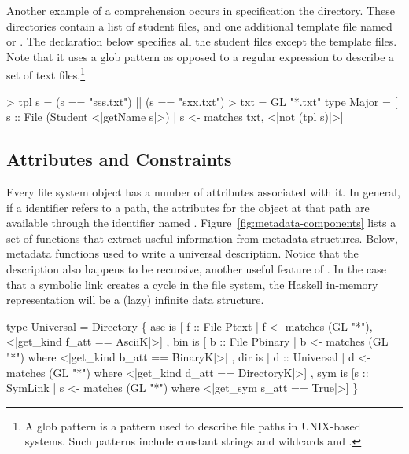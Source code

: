 \documentclass[nocopyrightspace,natbib]{sigplanconf}
\begin{document}
Another example of a comprehension occurs in specification the  
directory.  These directories contain a list of student files, and one additional
template file named  or .  The declaration below
specifies all the student files except the template files.  Note that it uses
a glob pattern as opposed to a regular expression
to describe a set of text files.\footnote{A glob pattern
is a pattern used to describe file paths in UNIX-based systems.  Such patterns include
constant strings and wildcards \cd{*} and .} 
\begin{code}
> tpl s = (s == "sss.txt") || (s == "sxx.txt")
> txt = GL "*.txt"
\mbox{}
type Major =   
  [ s :: File (Student <|getName s|>) 
  | s <- matches txt, <|not (tpl s)|>]
\end{code}

\subsection{Attributes and Constraints}
\label{sec:constraints}

Every file system object has a number of attributes associated with it.  In general,
if a \forest{} identifier  refers to a path, the attributes for the object at that
path are available through the identifier named . Figure~\ref{fig:metadata-components}
lists a set of functions that extract useful information from metadata structures.
Below, metadata functions used to write a universal description.
Notice that the description also happens to be recursive, another useful feature of
\forest{}.  In the case that a symbolic link creates a cycle in the file system, the Haskell
in-memory representation will be a (lazy) infinite data structure. 
\begin{code}
type Universal = Directory 
  \{ asc is [ f :: File Ptext   
           | f <- matches (GL "*"), 
            <|get_kind f_att == AsciiK|>]
  , bin is [ b :: File Pbinary
           | b <- matches (GL "*") 
           where <|get_kind b_att == BinaryK|>]
  , dir is [ d :: Universal  
           | d <- matches (GL "*") 
           where <|get_kind d_att == DirectoryK|>]
  , sym is [s :: SymLink      
           | s <- matches (GL "*") 
           where <|get_sym s_att == True|>]
  \}
\end{code}
\end{document}
